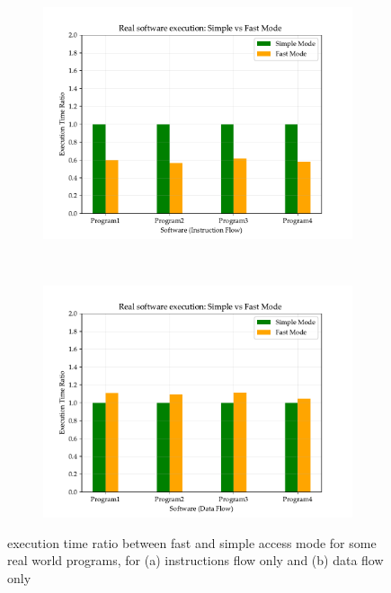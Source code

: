 \documentclass[a4paper,12pt]{article}
\begin{document}
\begin{figure}[H]
  \center
  \begin{subfigure}[b]{.8\textwidth}
    \includegraphics[width=\textwidth]{img/flow-i.pdf}
    \caption{}
  \end{subfigure}
  ~
  \begin{subfigure}[b]{.8\textwidth}
    \includegraphics[width=\textwidth]{img/flow-d.pdf}
    \caption{}
  \end{subfigure}

  \caption{execution time ratio between fast and simple access mode for some real world programs, for (a) instructions flow only and (b) data flow only}
  \label{fig:flow-i-d}
\end{figure}
\end{document}
